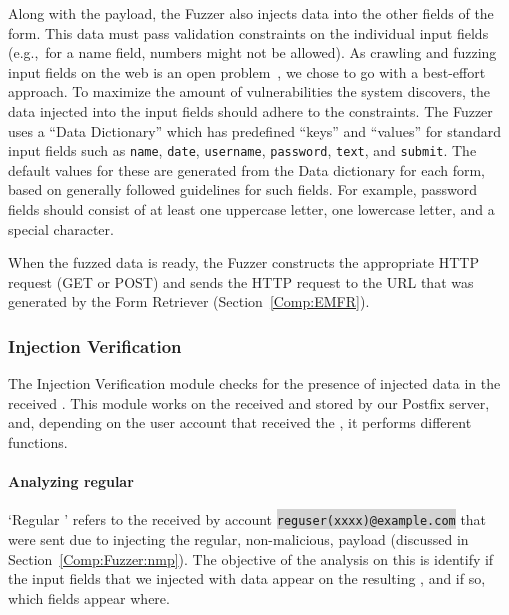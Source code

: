 Along with the payload, the Fuzzer also injects data into the other fields of the form. This data must pass validation constraints on the individual input fields (e.g.,\ for a name field, numbers might not be allowed).  As crawling and fuzzing input fields on the web is an open problem~\cite{raghavan2000crawling}, we chose to go with a best-effort approach. To maximize the amount of vulnerabilities the system discovers, the data injected into the input fields should adhere to the constraints. The Fuzzer uses a ``Data Dictionary'' which has predefined ``keys'' and ``values'' for standard input fields such as \texttt{name}, \texttt{date}, \texttt{username}, \texttt{password}, \texttt{text}, and \texttt{submit}.
The default values for these are generated from the Data dictionary for each form, based on generally followed guidelines for such fields. For example, password fields should consist of at least one uppercase letter, one lowercase letter, and a special character.

When the fuzzed data is ready, the Fuzzer constructs the appropriate HTTP request (GET or POST) and sends the HTTP request to the URL that was generated by the \Email Form Retriever (Section~\ref{Comp:EMFR}). 


\subsubsection{Injection Verification}
\label{Comp:EMA}
The Injection Verification module checks for the presence of injected data in the received \emails. This module works on the \emails received and stored by our Postfix server, and, depending on the user account that received the \email, it performs different functions.
\paragraph{Analyzing regular \email}
\sloppy
`Regular \email' refers to the \emails received by account \colorbox{lightgray}{\lstinline{reguser(xxxx)@example.com}} that were sent due to injecting the regular, non-malicious, payload (discussed in Section~\ref{Comp:Fuzzer:nmp}). The objective of the analysis on this \email is identify if the input fields that we injected with data appear on the resulting \email, and if so, which fields appear where.

